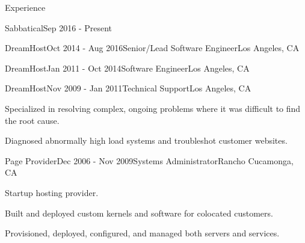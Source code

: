 \documentclass{resume} %
\begin{document}
\begin{rSection}{Experience}

\begin{rSubsection}{Sabbatical}{Sep 2016 - Present}{}{}
\end{rSubsection}


\begin{rSubsection}{DreamHost}{Oct 2014 - Aug 2016}{Senior/Lead Software Engineer}{Los Angeles, CA}
\end{rSubsection}


\begin{rSubsection}{DreamHost}{Jan 2011 - Oct 2014}{Software Engineer}{Los Angeles, CA}
\end{rSubsection}


\begin{rSubsection}{DreamHost}{Nov 2009 - Jan 2011}{Technical Support}{Los Angeles, CA}
\item Specialized in resolving complex, ongoing problems where it was difficult to find the root cause.
\item Diagnosed abnormally high load systems and troubleshot customer websites.
\end{rSubsection}


\begin{rSubsection}{Page Provider}{Dec 2006 - Nov 2009}{Systems Administrator}{Rancho Cucamonga, CA}
\item Startup hosting provider.
\item Built and deployed custom kernels and software for colocated customers.
\item Provisioned, deployed, configured, and managed both servers and services.
\end{rSubsection}

\end{rSection}

\end{document}

